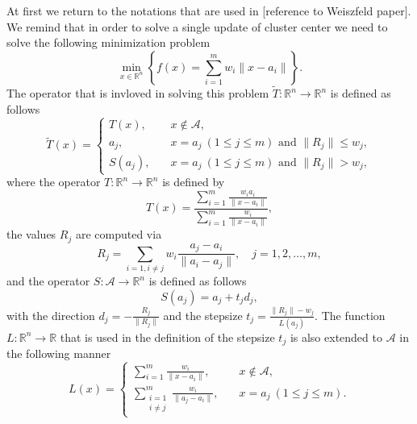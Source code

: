 \documentclass[11pt]{article}
\numberwithin{equation}{section}
\begin{document}
At first we return to the notations that are used in [reference to Weiszfeld paper]. We remind that in order to solve a single update of cluster center we need to solve the following minimization problem
\begin{equation}
	\min\limits_{x \in \mathbb{R}^n} \left\lbrace f(x) = \sum\limits_{i=1}^{m} w_i \|x - a_i\| \right\rbrace . \label{StateEq50}
\end{equation}
The operator that is invloved in solving this problem $\tilde{T}: \mathbb{R}^n \rightarrow \mathbb{R}^n$ is defined as follows
\begin{equation*}
	\tilde{T}(x) = \begin{cases} T(x), \quad &x \notin \mathcal{A}, \\ 
a_j, \quad &x=a_j \: (1 \leq j \leq m) \mbox{ and } \|R_j\| \leq w_j, \\
S(a_j), \quad &x=a_j \: (1 \leq j \leq m) \mbox{ and } \|R_j\| > w_j, \end{cases}
\end{equation*}
where the operator $T: \mathbb{R}^n \rightarrow \mathbb{R}^n$ is defined by
\begin{equation*}
	T(x) = \frac{\sum\limits_{i=1}^{m}\frac{w_i a_i}{\|x - a_i\|}}{\sum\limits_{i=1}^{m}\frac{w_i}{\|x - a_i\|}} ,
\end{equation*}
the values $R_j$ are computed via
\begin{equation*}
	R_j= \sum\limits_{i=1,i \neq j} w_i\frac{a_j - a_i}{\|a_i - a_j\|}, \quad j=1,2, \ldots ,m ,
\end{equation*}
and the operator $S: \mathcal{A} \rightarrow \mathbb{R}^n$ is defined as follows
\begin{equation*}
	S(a_j)= a_j + t_j d_j,
\end{equation*}
with the direction $d_j = -\frac{R_j}{\|R_j\|}$ and the stepsize $t_j = \frac{\|R_j\| - w_j}{L(a_j)}$.
The function $L: \mathbb{R}^n \rightarrow \mathbb{R}$ that is used in the definition of the stepsize $t_j$ is also extended to $\mathcal{A}$  in the following manner
\begin{equation*}
	L(x)= \begin{cases} \sum\limits_{i=1}^{m} \frac{w_i}{\|x - a_i\|}, \quad &x \notin \mathcal{A}, \\ 
\sum\limits_{\substack{i=1 \\ i \neq j}}^{m} \frac{w_i}{\|a_j - a_i\|}, \quad &x=a_j \: (1 \leq j \leq m). \end{cases}
\end{equation*}
\end{document}
